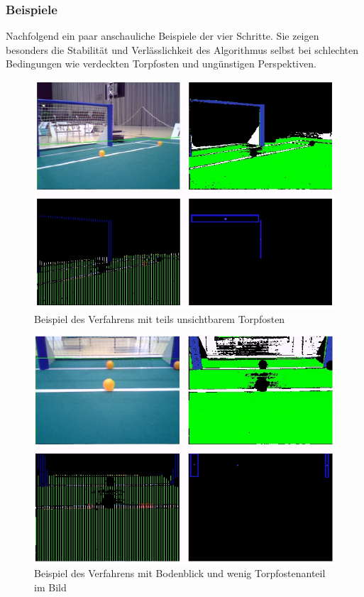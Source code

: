 \documentclass[a4paper,12pt]{article}
\begin{document}
\subsubsection{Beispiele}
Nachfolgend ein paar anschauliche Beispiele der vier Schritte. Sie zeigen
besonders die Stabilität und Verlässlichkeit des Algorithmus selbst bei 
schlechten Bedingungen wie verdeckten Torpfosten und ungünstigen Perspektiven.
\begin{figure}[H]
    \includegraphics[scale=0.8]{example-detection1.png}
    \caption{Beispiel des Verfahrens mit teils unsichtbarem Torpfosten}
    \label{fig:example1}
\end{figure}

\begin{figure}[H]
    \includegraphics[scale=0.8]{example-detection2.png}
    \caption{Beispiel des Verfahrens mit Bodenblick und wenig Torpfostenanteil im Bild}
    \label{fig:example2}
\end{figure}
\end{document}
